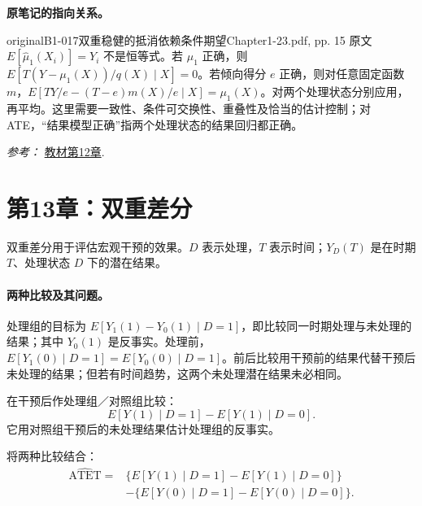 {\par{}\smallskip\textbf{原笔记的指向关系。}\par\smallskip
{}
\begin{reviewnote}{original}{B1-017}{双重稳健的抵消依赖条件期望}{Chapter1-23.pdf, pp. 15}
原文 $E[\hat\mu_1(X_i)]=Y_i$ 不是恒等式。若 $\mu_1$ 正确，则 $E[T(Y-\mu_1(X))/q(X)\mid X]=0$。若倾向得分 $e$ 正确，则对任意固定函数 $m$，$E[TY/e-(T-e)m(X)/e\mid X]=\mu_1(X)$。对两个处理状态分别应用，再平均。这里需要一致性、条件可交换性、重叠性及恰当的估计控制；对 ATE，“结果模型正确”指两个处理状态的结果回归都正确。
\par\smallskip\textit{参考：} \href{https://matheusfacure.github.io/python-causality-handbook/12-Doubly-Robust-Estimation.html}{教材第12章}.
\end{reviewnote}
\section{第13章：双重差分}
双重差分用于评估宏观干预的效果。$D$ 表示处理，$T$ 表示时间；$Y_D(T)$ 是在时期 $T$、处理状态 $D$ 下的潜在结果。

\paragraph{两种比较及其问题。}
处理组的目标为 $E[Y_1(1)-Y_0(1)\mid D=1]$，即比较同一时期处理与未处理的结果；其中 $Y_0(1)$ 是反事实。处理前，$E[Y_1(0)\mid D=1]=E[Y_0(0)\mid D=1]$。前后比较用干预前的结果代替干预后未处理的结果；但若有时间趋势，这两个未处理潜在结果未必相同。

在干预后作处理组／对照组比较：
\[E[Y(1)\mid D=1]-E[Y(1)\mid D=0].\]
它用对照组干预后的未处理结果估计处理组的反事实。

将两种比较结合：
\begin{align*}
\widehat{\mathrm{ATET}}={}&\{E[Y(1)\mid D=1]-E[Y(1)\mid D=0]\}\\
&-\{E[Y(0)\mid D=1]-E[Y(0)\mid D=0]\}.
\end{align*}

}
